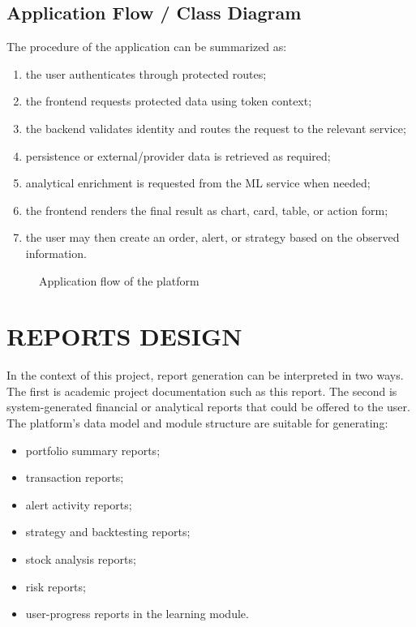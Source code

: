 \documentclass[12pt,a4paper]{report}
\begin{document}
\subsection{Application Flow / Class Diagram}
The procedure of the application can be summarized as:
\begin{enumerate}[label=\arabic*.]
\item the user authenticates through protected routes;
\item the frontend requests protected data using token context;
\item the backend validates identity and routes the request to the relevant service;
\item persistence or external/provider data is retrieved as required;
\item analytical enrichment is requested from the ML service when needed;
\item the frontend renders the final result as chart, card, table, or action form;
\item the user may then create an order, alert, or strategy based on the observed information.
\end{enumerate}

\begin{figure}[H]
\centering
{}
\caption{Application flow of the platform}
\end{figure}

\section{REPORTS DESIGN}
In the context of this project, report generation can be interpreted in two ways. The first is academic project documentation such as this report. The second is system-generated financial or analytical reports that could be offered to the user. The platform's data model and module structure are suitable for generating:
\begin{itemize}
\item portfolio summary reports;
\item transaction reports;
\item alert activity reports;
\item strategy and backtesting reports;
\item stock analysis reports;
\item risk reports;
\item user-progress reports in the learning module.
\end{itemize}
\end{document}
